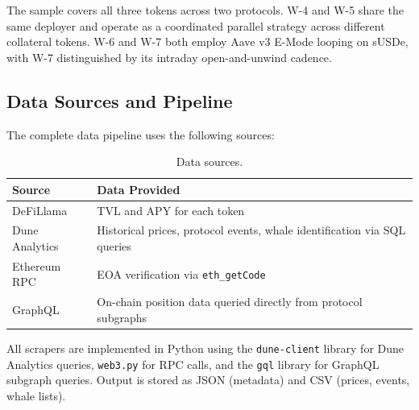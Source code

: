 The sample covers all three tokens across two protocols. W-4 and W-5 share the same deployer and operate as a coordinated parallel strategy across different collateral tokens. W-6 and W-7 both employ Aave v3 E-Mode looping on sUSDe, with W-7 distinguished by its intraday open-and-unwind cadence.
\subsection{Data Sources and Pipeline}
The complete data pipeline uses the following sources:
\begin{table}[h!]
\centering
\caption{Data sources.}
\label{tab:sources}
\begin{tabular}{lp{8cm}}
\hline
\textbf{Source} & \textbf{Data Provided} \\
\hline
DeFiLlama & TVL and APY for each token \\
Dune Analytics & Historical prices, protocol events, whale identification via SQL queries \\
Ethereum RPC & EOA verification via \texttt{eth\_getCode} \\
GraphQL & On-chain position data queried directly from protocol subgraphs \\
\hline
\end{tabular}
\end{table}
All scrapers are implemented in Python using the \texttt{dune-client} library for Dune Analytics queries, \texttt{web3.py} for RPC calls, and the \texttt{gql} library for GraphQL subgraph queries. Output is stored as JSON (metadata) and CSV (prices, events, whale lists).